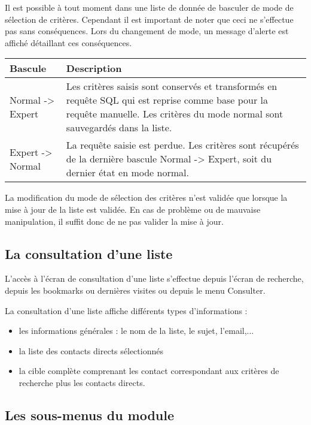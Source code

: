 Il est possible à tout moment dans une liste de donnée de basculer de mode de sélection de critères.
Cependant il est important de noter que ceci ne s'effectue pas sans conséquences.
Lors du changement de mode, un message d'alerte est affiché détaillant ces conséquences.\\

\begin{tabular}{|p{3cm}|p{10cm}|}
\hline
\textbf{Bascule} & \textbf{Description} \\
\hline
Normal -> Expert & Les critères saisis sont conservés et transformés en requête SQL qui est reprise comme base pour la requête manuelle. Les critères du mode normal sont sauvegardés dans la liste.\\
\hline
Expert -> Normal & La requête saisie est perdue. Les critères sont récupérés de la dernière bascule Normal -> Expert, soit du dernier état en mode normal.\\
\hline
\end{tabular}
\vspace{0.3cm}

La modification du mode de sélection des critères n'est validée que lorsque la mise à jour de la liste est validée.
En cas de problème ou de mauvaise manipulation, il suffit donc de ne pas valider la mise à jour.
 

\subsection{La consultation d'une liste}
\label{u_list_consult}

L'accès à l'écran de consultation d'une liste s'effectue depuis l'écran de recherche, depuis les bookmarks ou dernières visites ou depuis le menu Consulter.

La consultation d'une liste affiche différents types d'informations :\\

\begin{itemize}
\item les informations générales : le nom de la liste, le sujet, l'email,...
\item la liste des contacts directs sélectionnés
\item la cible complète comprenant les contact correspondant aux critères de recherche plus les contacts directs.
\end{itemize}


\subsection{Les sous-menus du module \List}

